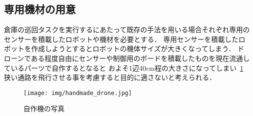 \subsection{専用機材の用意}
\label{equipment_problem}
倉庫の巡回タスクを実行するにあたって既存の手法を用いる場合それぞれ専用のセンサーを積載したロボットや機材を必要とする．
専用センサーを積載したロボットを作成しようとするとロボットの機体サイズが大きくなってしまう．
ドローンである程度自由にセンサーや制御用のボードを積載したものを現在流通しているパーツで自作するとなると
およそ1辺40cm程の大きさになってしまい~\ref{handmade_drone}狭い通路を飛行させる事を考慮すると目的に適さないと考えられる．

\begin{figure}[htbp]
  \begin{center}
    \texttt{[image: img/handmade\_drone.jpg]}
    \caption{自作機の写真}
    \label{handmade_drone}
  \end{center}
\end{figure}